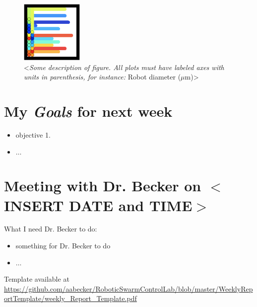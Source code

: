 \begin{figure}[h]
\begin{center}
\includegraphics[width=3cm]{fig/CovergeSimpleEnd.png}
\caption{<\emph{Some description of figure.  All plots must have labeled axes with units in parenthesis, for instance: } Robot diameter ($\mu$m)>}
\end{center}
\end{figure}


\section{My \emph{Goals} for next week}

\begin{itemize}
\item objective 1. 
\item $\ldots$
\end{itemize}

\section{Meeting with Dr. Becker on $<$INSERT DATE and TIME$>$}

What I need Dr. Becker to do:
\begin{itemize}
\item something for Dr. Becker to do
\item $\ldots$
\end{itemize}

{\tiny
Template available at \href{https://github.com/aabecker/RoboticSwarmControlLab/blob/master/WeeklyReportTemplate/weekly_Report_Template.pdf}{https://github.com/aabecker/RoboticSwarmControlLab/blob/master/WeeklyReportTemplate/weekly\_Report\_Template.pdf}
}

